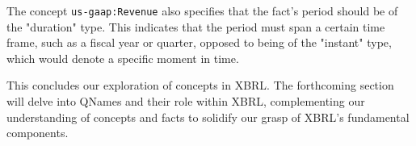 
The concept \texttt{us-gaap:Revenue} also specifies that the fact's period should be of the "duration" type.
This indicates that the period must span a certain time frame, such as a fiscal year or quarter,
opposed to being of the "instant" type, which would denote a specific moment in time.


This concludes our exploration of concepts in XBRL.
The forthcoming section will delve into QNames and their role within XBRL,
complementing our understanding of concepts and facts to solidify our grasp of XBRL's fundamental components.